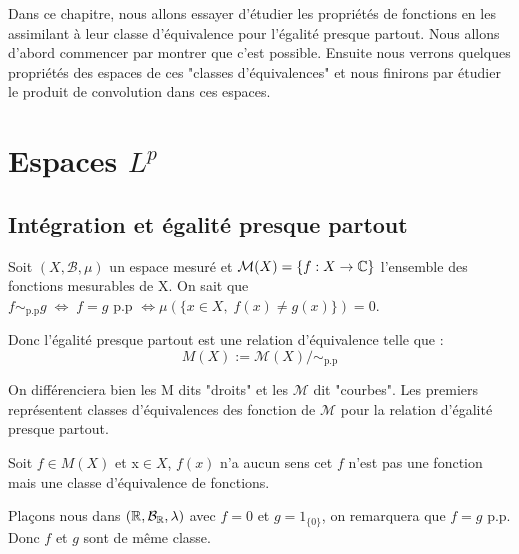 \minitoc  %


Dans ce chapitre, nous allons essayer d'étudier les propriétés de fonctions en les assimilant à leur classe d'équivalence 
pour l'égalité presque partout. Nous allons d'abord commencer par montrer que c'est possible. Ensuite nous verrons quelques propriétés
des espaces de ces "classes d'équivalences" et nous finirons par étudier le produit de convolution dans ces espaces. 


\section{Espaces $L^p$}

\subsection{Intégration et égalité presque partout}

Soit $(X,\mathcal{B},\mu)$ un espace mesuré et $\mathcal{M}(X) = \{f : X \rightarrow \mathbb{C}\}$ l'ensemble des fonctions mesurables 
de X. On sait que $ f \sim_{\text{p.p}} g \; \Longleftrightarrow \; f = g \text{ p.p } \Longleftrightarrow \mu (\{ x \in X, \; f(x) \not = g(x) \}) = 0 $. 

Donc l'égalité presque partout est une relation d'équivalence telle que :
    \[ M(X) := \mathcal{M}(X) / \sim_{\text{p.p}} \] 

On différenciera bien les M dits "droits" et les $\mathcal{M}$ dit "courbes". 
Les premiers représentent classes d'équivalences des fonction de $\mathcal{M}$ pour la relation d'égalité presque partout. 

\begin{remark}
    Soit $f \in M(X)$ et x$ \in X$, $f(x)$ n'a aucun sens cet $f$ n'est pas une fonction mais une classe d'équivalence de fonctions. 
\end{remark}

\begin{example}
    Plaçons nous dans $(\mathbb{R},\mathcal{B}_{\mathbb{R}},\lambda)$ avec $f = 0$ et $g = 1_{\{0\}}$, on remarquera que $f = g$ p.p. 
    Donc $f$ et $g$ sont de même classe. 
\end{example}

